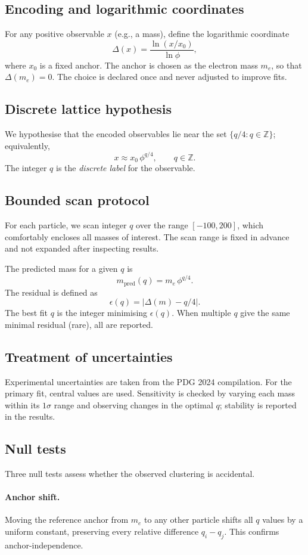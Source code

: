 ﻿\documentclass[12pt]{article}
\theoremstyle{definition}
\begin{document}
\subsection{Encoding and logarithmic coordinates}
For any positive observable $x$ (e.g., a mass), define the logarithmic coordinate
\[
\Delta(x) = \frac{\ln(x/x_0)}{\ln\phi},
\]
where $x_0$ is a fixed anchor. The anchor is chosen as the electron mass $m_e$, so that $\Delta(m_e)=0$. The choice is declared once and never adjusted to improve fits.

\subsection{Discrete lattice hypothesis}
We hypothesise that the encoded observables lie near the set $\{q/4 : q\in\mathbb{Z}\}$; equivalently,
\[
x \approx x_0 \,\phi^{q/4},\qquad q\in\mathbb{Z}.
\]
The integer $q$ is the \emph{discrete label} for the observable.

\subsection{Bounded scan protocol}
For each particle, we scan integer $q$ over the range $[-100,200]$, which comfortably encloses all masses of interest. The scan range is fixed in advance and not expanded after inspecting results.

The predicted mass for a given $q$ is
\[
m_{\text{pred}}(q) = m_e \,\phi^{q/4}.
\]
The residual is defined as
\[
\epsilon(q) = \bigl|\Delta(m) - q/4\bigr|.
\]
The best fit $q$ is the integer minimising $\epsilon(q)$. When multiple $q$ give the same minimal residual (rare), all are reported.

\subsection{Treatment of uncertainties}
Experimental uncertainties are taken from the PDG 2024 compilation. For the primary fit, central values are used. Sensitivity is checked by varying each mass within its $1\sigma$ range and observing changes in the optimal $q$; stability is reported in the results.

\subsection{Null tests}
Three null tests assess whether the observed clustering is accidental.

\paragraph{Anchor shift.}
Moving the reference anchor from $m_e$ to any other particle shifts all $q$ values by a uniform constant, preserving every relative difference $q_i - q_j$. This confirms anchor-independence.
\end{document}
